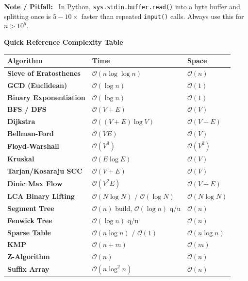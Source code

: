 \documentclass[10pt,a4paper]{article}
\theoremstyle{cpstyle}
\newenvironment{cpnote}{%
  \begin{mdframed}[backgroundcolor=notebg, linecolor=orange!70, linewidth=1pt,
    innerleftmargin=10pt, innerrightmargin=10pt, innertopmargin=6pt, innerbottommargin=6pt]
  \textbf{\color{orange!80!black}Note / Pitfall:}~}{%
  \end{mdframed}}
\newcommand{\bigO}[1]{\mathcal{O}\!\left(#1\right)}
\begin{document}
\begin{cpnote}
In Python, \texttt{sys.stdin.buffer.read()} into a byte buffer and splitting once is $5{-}10\times$ faster than repeated \texttt{input()} calls. Always use this for $n > 10^5$.
\end{cpnote}

\vspace{2cm}

\begin{mdframed}[backgroundcolor=theorembg, linecolor=accent, linewidth=2pt,
  innerleftmargin=20pt, innerrightmargin=20pt, innertopmargin=16pt, innerbottommargin=16pt]
\begin{center}
{\Large\bfseries\color{accent} Quick Reference Complexity Table}
\end{center}
\vspace{0.5em}
\begin{tabular}{>{\bfseries}p{4.5cm} p{3.5cm} p{4cm}}
\toprule
Algorithm & Time & Space \\
\midrule
Sieve of Eratosthenes & $\bigO{n \log \log n}$ & $\bigO{n}$ \\
GCD (Euclidean) & $\bigO{\log n}$ & $\bigO{1}$ \\
Binary Exponentiation & $\bigO{\log n}$ & $\bigO{1}$ \\
BFS / DFS & $\bigO{V+E}$ & $\bigO{V}$ \\
Dijkstra & $\bigO{(V+E)\log V}$ & $\bigO{V+E}$ \\
Bellman-Ford & $\bigO{VE}$ & $\bigO{V}$ \\
Floyd-Warshall & $\bigO{V^3}$ & $\bigO{V^2}$ \\
Kruskal & $\bigO{E \log E}$ & $\bigO{V}$ \\
Tarjan/Kosaraju SCC & $\bigO{V+E}$ & $\bigO{V}$ \\
Dinic Max Flow & $\bigO{V^2 E}$ & $\bigO{V+E}$ \\
LCA Binary Lifting & $\bigO{N \log N}$ / $\bigO{\log N}$ & $\bigO{N \log N}$ \\
Segment Tree & $\bigO{n}$ build, $\bigO{\log n}$ q/u & $\bigO{n}$ \\
Fenwick Tree & $\bigO{\log n}$ q/u & $\bigO{n}$ \\
Sparse Table & $\bigO{n \log n}$ / $\bigO{1}$ & $\bigO{n \log n}$ \\
KMP & $\bigO{n+m}$ & $\bigO{m}$ \\
Z-Algorithm & $\bigO{n}$ & $\bigO{n}$ \\
Suffix Array & $\bigO{n \log^2 n}$ & $\bigO{n}$ \\

\end{tabular}
\end{mdframed}
\end{document}
